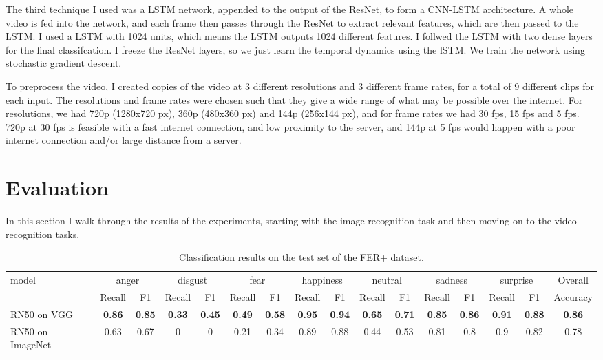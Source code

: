 \documentclass[sigconf]{acmart}
\begin{document}
{The third technique I used was a LSTM network, appended to the output of the
ResNet, to form a CNN-LSTM architecture. 
A whole video is fed into the network, and each frame then passes through the
ResNet to extract relevant features, which are then passed to the LSTM.
I used a LSTM with 1024 units, which
means the LSTM outputs 1024 different features. I follwed the LSTM with two
dense layers for the final classifcation.
I freeze the ResNet layers, so we just learn the temporal dynamics using the
lSTM. We train the network using stochastic gradient descent.

To preprocess the video, I created copies of the video at 3 different
resolutions and 3 different frame rates, for a total of 9 different clips for
each input. The resolutions and frame rates were chosen such that they give a
wide range of what may be possible over the internet. For resolutions, we had
720p (1280x720 px), 360p (480x360 px) and 144p (256x144 px), and for
frame rates we had 30 fps, 15 fps and 5 fps. 720p at 30 fps is feasible
with a fast internet connection, and low proximity to the server, and 144p at
5 fps would happen with a poor internet connection and/or large distance from
a server. 

\section{Evaluation}

In this section I walk through the results of the experiments, starting with
the image recognition task and then moving on to the video recognition tasks.

\begin{table}[htbp]
\caption{Classification results on the test set of the FER+ dataset.}
\label{tab:imageres}
\begin{tabular}{lccccccccccccccc}
\multirow{2}{*}{model} & \multicolumn{2}{c}{anger} &
\multicolumn{2}{c}{disgust} & \multicolumn{2}{c}{fear} &
\multicolumn{2}{c}{happiness} & \multicolumn{2}{c}{neutral} &
\multicolumn{2}{c}{sadness} & \multicolumn{2}{c}{surprise}  & Overall\\ \cline{2-16}
                       & Recall        & F1        
		       & Recall        & F1        & Recall        & F1
		       &  Recall        & F1        &  Recall        & F1
		       & Recall        & F1        & Recall        & F1    &
		       Accuracy    \\ \hline
RN50 on VGG & \textbf{0.86} &\textbf{0.85} &\textbf{0.33} &\textbf{0.45} &\textbf{0.49} &\textbf{0.58} &\textbf{0.95} &\textbf{0.94} &\textbf{0.65} &\textbf{0.71} &\textbf{0.85} &\textbf{0.86} &\textbf{0.91} &\textbf{0.88} &\textbf{0.86} \\
RN50 on ImageNet   & 0.63 &0.67 &0 &0 &0.21 &0.34 &0.89 &0.88 &0.44 &0.53 &0.81 &0.8 &0.9 &0.82 &0.78 \\
\end{tabular}
\end{table}

}
\end{document}
